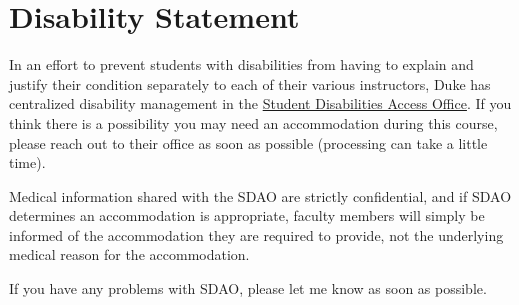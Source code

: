 \documentclass[12pt]{article}
\begin{document}
\section{Disability Statement}

In an effort to prevent students with disabilities from having to explain and justify their condition separately to each of their various instructors, Duke has centralized disability management in the \href{https://access.duke.edu/students}{Student Disabilities Access Office}. If you think there is a possibility you may need an accommodation during this course, please reach out to their office as soon as possible (processing can take a little time).

Medical information shared with the SDAO are strictly confidential, and if SDAO determines an accommodation is appropriate, faculty members will simply be informed of the accommodation they are required to provide, not the underlying medical reason for the accommodation.

If you have any problems with SDAO, please let me know as soon as possible.
\end{document}
